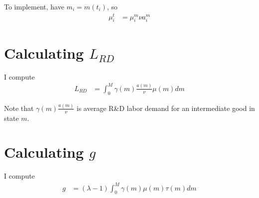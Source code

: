 \documentclass[11pt,english]{article}
\theoremstyle{remark}
\begin{document}
To implement, have $m_i = m(t_i)$, so
\begin{align*}
\mu^t_i &= \mu^m_i \nu a^m_i 
\end{align*}

\section{Calculating $L_{RD}$}

I compute
\begin{align*}
	L_{RD} &= \int_0^M \gamma(m) \frac{a(m)}{\nu} \mu(m)  dm
\end{align*}

Note that $\gamma(m) \frac{a(m)}{\nu}$ is average R\&D labor demand for an intermediate good in state $m$.

\section{Calculating $g$}

I compute
\begin{align*}
	g &= (\lambda - 1)\int_0^M \gamma(m) \mu(m) \tau(m) dm
\end{align*}
\end{document}
